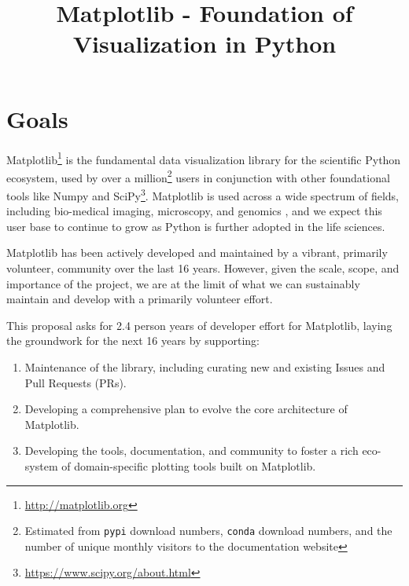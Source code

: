 \documentclass[11pt,letterpaper]{article}  %
\begin{document}
\title{Matplotlib - Foundation of Visualization in Python}
\author{}
\maketitle

\section{Goals}

Matplotlib\footnote{\url{http://matplotlib.org}} is the fundamental
data visualization library for the scientific Python ecosystem, used
by over a million\footnote{Estimated from \texttt{pypi} download
numbers, \texttt{conda} download numbers, and the number of unique
monthly visitors to the documentation website} users in conjunction
with other foundational tools like Numpy and
SciPy\footnote{\url{https://www.scipy.org/about.html}}.  Matplotlib is
used across a wide spectrum of fields, including bio-medical imaging,
microscopy, and genomics
\cite{Carpenter2006,Wolf2018,10.7717/peerj.453,
  Segata2011,10.1371/journal.pgen.1000695,HASHIMSHONY2012666,
  10.1093/bioinformatics/bts480,Carlile2014,Laganowsky2014,Jiangaac9462,
  10.3389/fninf.2014.00014}, and we expect this user base to continue
to grow as Python is further adopted in the life sciences.

Matplotlib has been actively developed and maintained by a vibrant,
primarily volunteer, community over the last 16 years.  However, given
the scale, scope, and importance of the project, we are at the limit
of what we can sustainably maintain and develop with a primarily
volunteer effort.

This proposal asks for 2.4 person years of developer effort for
Matplotlib, laying the groundwork for the next 16 years by supporting:

\begin{enumerate}[label=\alph*),noitemsep]
  \item Maintenance of the library, including curating new and
    existing Issues and Pull Requests (PRs).
  \item Developing a comprehensive plan to evolve the core architecture
    of Matplotlib.
  \item Developing the tools, documentation, and community to foster a
    rich eco-system of domain-specific plotting tools built on
    Matplotlib.
\end{enumerate}


\end{document}
